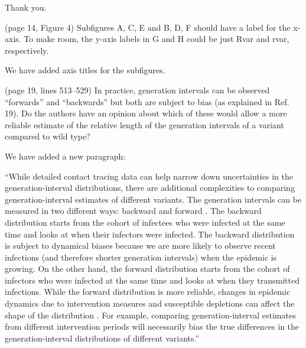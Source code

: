 \documentclass[12pt]{article}
\newcommand{\revtext}{\textsf}
\begin{document}
Thank you.

\revtext{(page 14, Figure 4) Subfigures A, C, E and B, D, F should have a label
for the x-axis. To make room, the y-axis labels in G and H could be just
Rvar and rvar, respectively.}

We have added axis titles for the subfigures.

\revtext{(page 19, lines 513–529) In practice, generation intervals can be observed
``forwards'' and ``backwards'' but both are subject to bias (as explained in
Ref. 19). Do the authors have an opinion about which of these would allow
a more reliable estimate of the relative length of the generation intervals
of a variant compared to wild type?}

We have added a new paragraph:

``While detailed contact tracing data can help narrow down uncertainties in the generation-interval distributions, there are additional complexities to comparing generation-interval estimates of different variants.
The generation intervals can be measured in two different ways: backward and forward \citep{champredon2015intrinsic}.
The backward distribution starts from the cohort of infectees who were infected at the same time and looks at when their infectors were infected. 
The backward distribution is subject to dynamical biases because we are more likely to observe recent infections (and therefore shorter generation intervals) when the epidemic is growing.
On the other hand, the forward distribution starts from the cohort of infectors who were infected at the same time and looks at when they transmitted infections.
While the forward distribution is more reliable, changes in epidemic dynamics due to intervention measures and susceptible depletions can affect the shape of the distribution \citep{ali2020serial, nishiura2010time}.
For example, comparing generation-interval estimates from different intervention periods will necessarily bias the true differences in the generation-interval distributions of different variants.''


\end{document}
